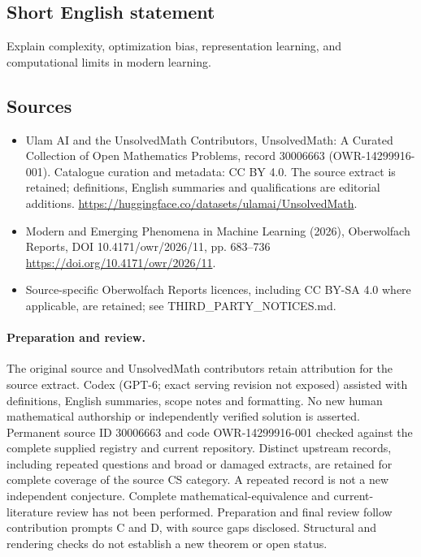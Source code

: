 \documentclass[11pt]{article}
\begin{document}
\subsection{Short English statement}
Explain complexity, optimization bias, representation learning, and computational limits in modern learning.
\subsection{Sources}
\begin{itemize}
\item[\hypertarget{source:30006663:1}{S1}] Ulam AI and the UnsolvedMath Contributors, UnsolvedMath: A Curated Collection of Open Mathematics Problems, record 30006663 (OWR-14299916-001). Catalogue curation and metadata: CC BY 4.0. The source extract is retained; definitions, English summaries and qualifications are editorial additions.
\url{https://huggingface.co/datasets/ulamai/UnsolvedMath}.
\item[\hypertarget{source:30006663:2}{S2}] Modern and Emerging Phenomena in Machine Learning (2026), Oberwolfach Reports, DOI 10.4171/owr/2026/11, pp. 683--736
\url{https://doi.org/10.4171/owr/2026/11}.
\item Source-specific Oberwolfach Reports licences, including CC BY-SA 4.0 where applicable, are retained; see THIRD\_PARTY\_NOTICES.md.
\end{itemize}
\paragraph{Preparation and review.}
The original source and UnsolvedMath contributors retain attribution for the source extract. Codex (GPT-6; exact serving revision not exposed) assisted with definitions, English summaries, scope notes and formatting. No new human mathematical authorship or independently verified solution is asserted. Permanent source ID 30006663 and code OWR-14299916-001 checked against the complete supplied registry and current repository. Distinct upstream records, including repeated questions and broad or damaged extracts, are retained for complete coverage of the source CS category. A repeated record is not a new independent conjecture. Complete mathematical-equivalence and current-literature review has not been performed. Preparation and final review follow contribution prompts C and D, with source gaps disclosed. Structural and rendering checks do not establish a new theorem or open status.
\label{end:30006663}
\end{document}
